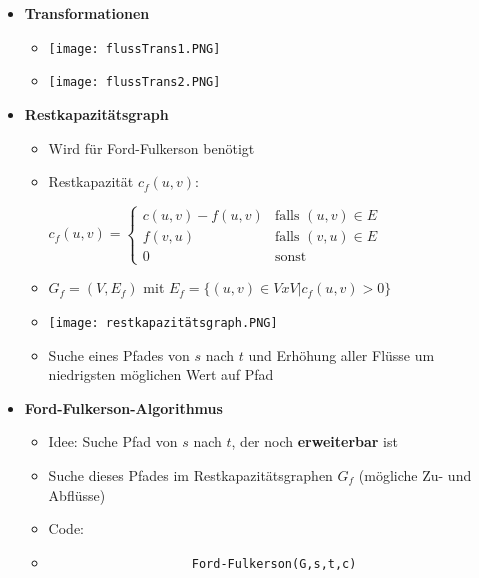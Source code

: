 \begin{itemize}
        \item \textbf{Transformationen}
            \begin{itemize}
                \item[] \texttt{[image: flussTrans1.PNG]}
                \item[] \texttt{[image: flussTrans2.PNG]}
            \end{itemize}

        \item \textbf{Restkapazitätsgraph}
            \begin{itemize}
                \item Wird für Ford-Fulkerson benötigt
                \item Restkapazität $c_f(u,v)$: \\
                        \centerline{$c_f(u,v) = \begin{cases}
                                                c(u,v) - f(u,v) & \text{falls $(u,v) \in E$} \\
                                                f(v,u) & \text{falls $(v,u) \in E$} \\
                                                0 & \text{sonst}
                                                \end{cases}$}
                \item $G_f = (V, E_f)$ mit $E_f = \{(u,v) \in V x V | c_f(u,v) > 0 \}$
                \item[] \texttt{[image: restkapazitätsgraph.PNG]}
                \item Suche eines Pfades von $s$ nach $t$ und Erhöhung aller Flüsse um niedrigsten möglichen Wert auf Pfad
            \end{itemize}


        \item \textbf{Ford-Fulkerson-Algorithmus}
            \begin{itemize}
                \item Idee: Suche Pfad von $s$ nach $t$, der noch \textbf{erweiterbar} ist
                \item Suche dieses Pfades im Restkapazitätsgraphen $G_f$ (mögliche Zu- und Abflüsse)
                \item Code:
                \item[]
                    \begin{verbatim}
                    Ford-Fulkerson(G,s,t,c)


\end{verbatim}
\end{itemize}
\end{itemize}
